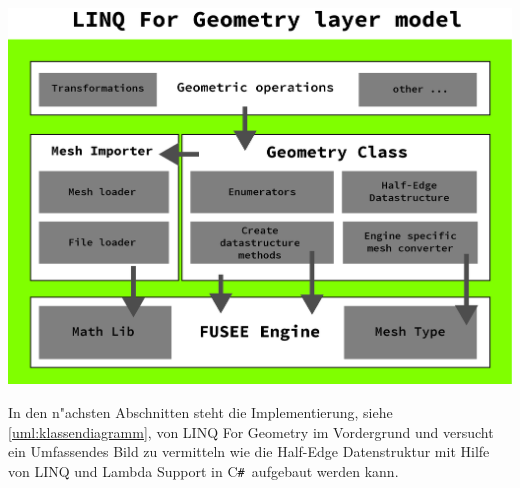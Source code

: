 \documentclass[pagesize, paper=a4, fontsize=12pt,titlepage=true, headings=small, headnosepline, abstractoff, liststotoc, nochapterprefix, plainheadsepline]{scrreprt}
\newcommand{\CSS}{C\texttt{\# }}
\newcommand{\LFGS}{LINQ For Geometry }
\newcommand{\HES}{Half-Edge Datenstruktur }
\begin{document}
\includegraphics[width=\linewidth]{../Bilder/LFGLayer}
\label{pic:LFGLayer} 


In den n"achsten Abschnitten steht die Implementierung, siehe \ref{uml:klassendiagramm}, von \LFGS im Vordergrund und versucht ein Umfassendes Bild zu vermitteln wie die \HES mit Hilfe von LINQ und Lambda Support in \CSS aufgebaut werden kann.
\newline
\end{document}
